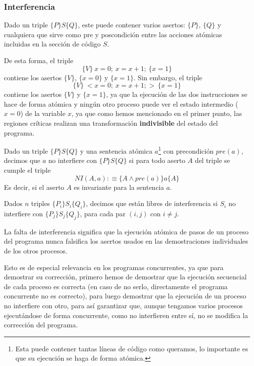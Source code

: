 \subsubsection{Interferencia}
Dado un triple $\{P\}S\{Q\}$, este puede contener varios asertos: $\{P\}$, $\{Q\}$ y cualquiera que sirve como pre y poscondición entre las acciones atómicas incluidas en la sección de código $S$.
\begin{ejemplo}
    De esta forma, el triple 
    \begin{equation*}
        \{V\}\ x=0;\ x=x+1;\ \{x=1\} 
    \end{equation*}
    contiene los asertos $\{V\}$, $\{x=0\}$ y $\{x=1\}$. Sin embargo, el triple 
    \begin{equation*}
        \{V\}\ <x=0;\ x=x+1;>\ \{x=1\}
    \end{equation*}
    contiene los asertos $\{V\}$ y $\{x=1\}$, ya que la ejecución de las dos instrucciones se hace de forma atómica y ningún otro proceso puede ver el estado intermedio ($x=0$) de la variable $x$, ya que como hemos mencionado en el primer punto, las regiones críticas realizan una transformación \textbf{indivisible} del estado del programa.
\end{ejemplo}
\begin{definicion}[Interferencia]
    Dado un triple $\{P\}S\{Q\}$ y una sentencia atómica $a$\footnote{Esta puede contener tantas líneas de código como queramos, lo importante es que su ejecución se haga de forma atómica.} con precondición $pre(a)$, decimos que $a$ no interfiere con $\{P\}S\{Q\}$ si para todo aserto $A$ del triple se cumple el triple
    \begin{equation*}
        NI(A, a) :\equiv \{A \land pre(a)\} a \{A\}
    \end{equation*}
    Es decir, si el aserto $A$ es invariante para la sentencia $a$.
\end{definicion}
\begin{definicion}
    Dados $n$ triples $\{P_i\}S_i\{Q_i\}$, decimos que están libres de interferencia si $S_i$ no interfiere con $\{P_j\}S_j\{Q_j\}$, para cada par $(i,j)$ con $i\neq j$.
\end{definicion}
La falta de interferencia significa que la ejecución atómica de pasos de un proceso del programa nunca falsifica los asertos usados en las demostraciones individuales de los otros procesos.

Esto es de especial relevancia en los programas concurrentes, ya que para demostrar su corrección, primero hemos de demostrar que la ejecución secuencial de cada proceso es correcta (en caso de no serlo, directamente el programa concurrente no es correcto), para luego demostrar que la ejecución de un proceso no interfiere con otro, para así garantizar que, aunque tengamos varios procesos ejecutándose de forma concurrente, como no interfieren entre sí, no se modifica la corrección del programa.

